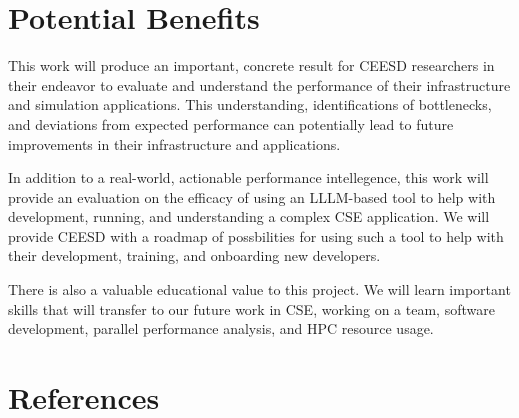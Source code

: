 \documentclass[11pt]{article}
\begin{document}
\section{Potential Benefits}

This work will produce an important, concrete result for CEESD researchers in their endeavor to evaluate and understand the performance of their infrastructure and simulation applications.  This understanding, identifications of bottlenecks, and deviations from expected performance can potentially lead to future improvements in their infrastructure and applications.

In addition to a real-world, actionable performance intellegence, this work will provide an evaluation on the efficacy of using an LLLM-based tool to help with development, running, and understanding a complex CSE application.  We will provide CEESD with a roadmap of possbilities for using such a tool to help with their development, training, and onboarding new developers.

There is also a valuable educational value to this project. We will learn important skills that will transfer to our future work in CSE, working on a team, software development, parallel performance analysis, and HPC resource usage.

\section{References}
\renewcommand{\refname}{}
\vspace{-25pt}

\end{document}
